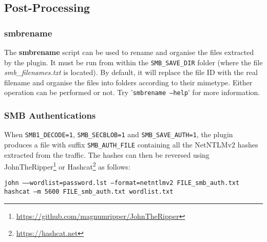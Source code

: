 \documentclass[documentation]{subfiles}
\begin{document}
\subsection{Post-Processing}\label{smb:postproc}

\subsubsection{smbrename}
The {\bf smbrename} script can be used to rename and organise the files extracted by the plugin.
It must be run from within the {\tt SMB\_SAVE\_DIR} folder (where the file {\em smb\_filenames.txt} is located). By default, it will replace the file ID with the real filename and organise the files into folders according to their mimetype. Either operation can be performed or not. Try '{\tt smbrename --help}' for more information.

\subsubsection{SMB Authentications}
When {\tt SMB1\_DECODE=1}, {\tt SMB\_SECBLOB=1} and {\tt SMB\_SAVE\_AUTH=1}, the plugin produces a file with suffix {\tt SMB\_AUTH\_FILE} containing all the NetNTLMv2 hashes extracted from the traffic.
The hashes can then be reversed using JohnTheRipper\footnote{\url{https://github.com/magnumripper/JohnTheRipper}} or Hashcat\footnote{\url{https://hashcat.net}} as follows:

\begin{center}
    {\tt john --{}--wordlist=password.lst --format=netntlmv2 FILE\_smb\_auth.txt}\\
    {\tt hashcat --m 5600 FILE\_smb\_auth.txt wordlist.txt}
\end{center}



\end{document}
